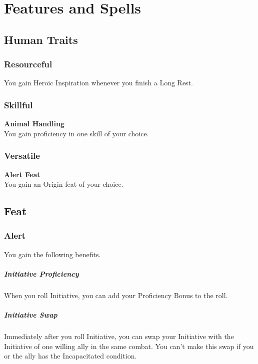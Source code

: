 \documentclass[letterpaper,openany,oneside,twocolumn]{book}
\begin{document}
\onecolumn


\rendercharactersheet

\renderbackgroundsheet

\renderspellsheet

\renderoldspellsheet


\restoregeometry
\twocolumn

\chapter*{Features and Spells}

\section*{Human Traits}
\subsection*{Resourceful}
You gain Heroic Inspiration whenever you finish a Long Rest. 
\subsection*{Skillful}
\textbf{Animal Handling}\\
You gain proficiency in one skill of your choice.
\subsection*{Versatile}
\textbf{Alert Feat}\\
You gain an Origin feat of your choice.

\section*{Feat}
\subsection*{Alert}
You gain the following benefits.
\paragraph*{Initiative Proficiency} When you roll Initiative, you can add your Proficiency Bonus to the roll.
\paragraph*{Initiative Swap} Immediately after you roll Initiative, you can swap your Initiative with the Initiative of one willing ally in the same combat. You can't make this swap if you or the ally has the Incapacitated condition. 
\end{document}
